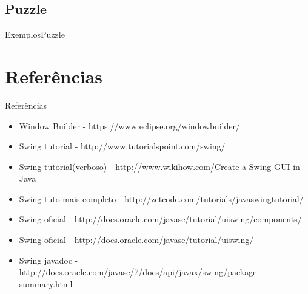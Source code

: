 \documentclass[10pt]{beamer}
\begin{document}
\subsection{Puzzle}
\begin{frame}{Exemplos}{Puzzle}
\end{frame}{}
\section{Referências}
\begin{frame}{Referências}{}
\begin{itemize}
\item Window Builder - https://www.eclipse.org/windowbuilder/
\item Swing tutorial - http://www.tutorialspoint.com/swing/
\item Swing tutorial(verboso) - http://www.wikihow.com/Create-a-Swing-GUI-in-Java
\item Swing tuto mais completo - http://zetcode.com/tutorials/javaswingtutorial/
\item Swing oficial - http://docs.oracle.com/javase/tutorial/uiswing/components/
\item Swing oficial - http://docs.oracle.com/javase/tutorial/uiswing/
\item Swing javadoc - http://docs.oracle.com/javase/7/docs/api/javax/swing/package-summary.html
\end{itemize}
\end{frame}
\end{document}

